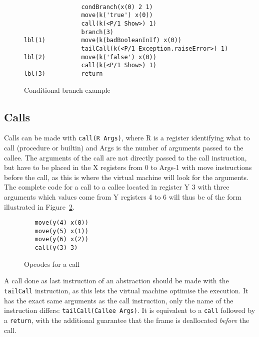 \documentclass[a4paper]{memoir}
\begin{document}
\begin{figure}[ht]
\begin{lstlisting}

                condBranch(x(0) 2 1)
                move(k('true') x(0))
                call(k(<P/1 Show>) 1)
                branch(3)
lbl(1)          move(k(badBooleanInIf) x(0))
                tailCall(k(<P/1 Exception.raiseError>) 1)
lbl(2)          move(k('false') x(0))
                call(k(<P/1 Show>) 1)
lbl(3)          return

\end{lstlisting}
\caption{Conditional branch example}
\label{fig:target:condBranch}
\end{figure}



\subsection{Calls}\label{sec:opcode:calls}
Calls can be made with \lstinline!call(R Args)!, where R is a register
identifying what to call (procedure or builtin) and Args is the number of
arguments passed to the callee. The arguments of the call are not directly
passed to the call instruction, but have to be placed in the X registers from 0
to Args-1 with move instructions before the call, as this is where the virtual
machine will look for the arguments. The complete code for a call to a callee
located in register Y 3 with three arguments which values come from Y registers
4 to 6 will thus be of the form illustrated in
Figure~\ref{fig:opcodes:callexample}.
\begin{figure}[h]
\begin{lstlisting}
   move(y(4) x(0))
   move(y(5) x(1))
   move(y(6) x(2))
   call(y(3) 3)
\end{lstlisting}
\caption{Opcodes for a call}
\label{fig:opcodes:callexample}
\end{figure}


A call done as last instruction of an abstraction should be made with the
\lstinline!tailCall! instruction, as this lets the virtual machine optimise the
execution. It has the exact same arguments as the call instruction, only the
name of the instruction differs: \lstinline!tailCall(Callee Args)!. It is
equivalent to a \lstinline!call! followed by a \lstinline!return!, with the
additional guarantee that the frame is deallocated \emph{before} the call.
\end{document}
